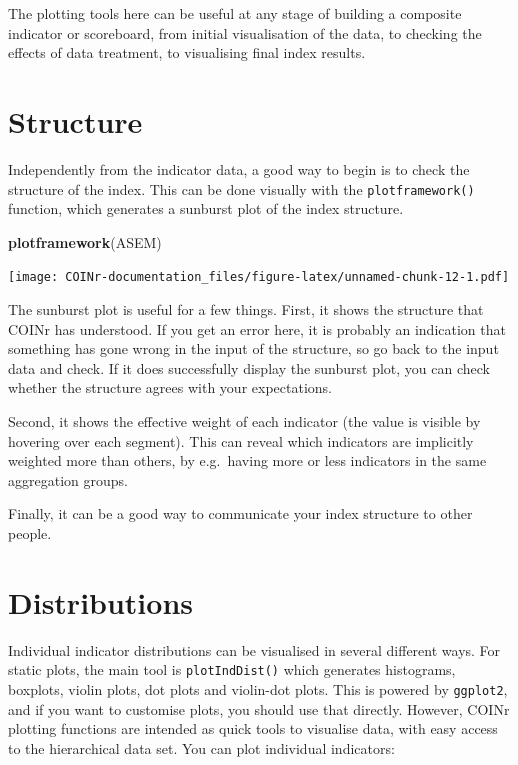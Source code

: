 \documentclass[
]{book}
\newenvironment{Shaded}{\begin{snugshade}}{\end{snugshade}}
\newcommand{\KeywordTok}[1]{\textcolor[rgb]{0.13,0.29,0.53}{\textbf{#1}}}
\newcommand{\NormalTok}[1]{#1}
\begin{document}
The plotting tools here can be useful at any stage of building a composite indicator or scoreboard, from initial visualisation of the data, to checking the effects of data treatment, to visualising final index results.

\hypertarget{structure}{%
\section{Structure}\label{structure}}

Independently from the indicator data, a good way to begin is to check the structure of the index. This can be done visually with the \texttt{plotframework()} function, which generates a sunburst plot of the index structure.

\begin{Shaded}
\begin{Highlighting}[]
\KeywordTok{plotframework}\NormalTok{(ASEM)}
\end{Highlighting}
\end{Shaded}

\texttt{[image: COINr-documentation\_files/figure-latex/unnamed-chunk-12-1.pdf]}

The sunburst plot is useful for a few things. First, it shows the structure that COINr has understood. If you get an error here, it is probably an indication that something has gone wrong in the input of the structure, so go back to the input data and check. If it does successfully display the sunburst plot, you can check whether the structure agrees with your expectations.

Second, it shows the effective weight of each indicator (the value is visible by hovering over each segment). This can reveal which indicators are implicitly weighted more than others, by e.g.~having more or less indicators in the same aggregation groups.

Finally, it can be a good way to communicate your index structure to other people.

\hypertarget{distributions}{%
\section{Distributions}\label{distributions}}

Individual indicator distributions can be visualised in several different ways. For static plots, the main tool is \texttt{plotIndDist()} which generates histograms, boxplots, violin plots, dot plots and violin-dot plots. This is powered by \texttt{ggplot2}, and if you want to customise plots, you should use that directly. However, COINr plotting functions are intended as quick tools to visualise data, with easy access to the hierarchical data set. You can plot individual indicators:
\end{document}
